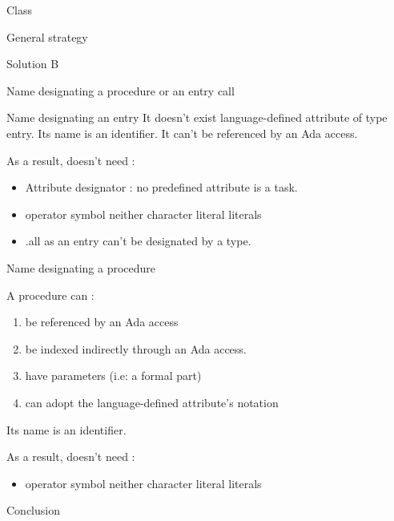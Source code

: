 \documentclass[a4paper]{prjdoc}
\begin{document}
\begin{asection}{Class }
\begin{asection}{General strategy}
\begin{asection}{Solution B}
\begin{asection}{Name designating a procedure or an entry call}
\begin{asection}{Name designating an entry}
                 It doesn't exist language-defined attribute of type entry.
                 Its name is an identifier.
                 It can't be referenced by an Ada access.
              
             As a result,  doesn't need :
                 \begin{itemize}
                 \item Attribute designator : no predefined attribute is a task.
                 \item operator symbol neither character literal literals
                 \item .all as an entry can't be designated by a type. 
                 \end{itemize}              
           
              \end{asection} %
           
              \begin{asection}{Name designating a procedure}
         
                 A procedure can :
                    \begin{enumerate}
                    \item be referenced by an Ada access
                    \item be indexed indirectly through an Ada access.
                    \item have parameters (i.e: a formal part)
                    \item can adopt the language-defined attribute's notation
                    \end{enumerate}              
             
                Its name is an identifier.
              
                As a result,  doesn't need :
                   \begin{itemize}
                   \item operator symbol neither character literal literals 
                   \end{itemize}  
         
              \end{asection} %
              
              \begin{asection}{Conclusion}
              

\end{asection}
\end{asection}
\end{asection}
\end{asection}
\end{asection}
\end{document}
